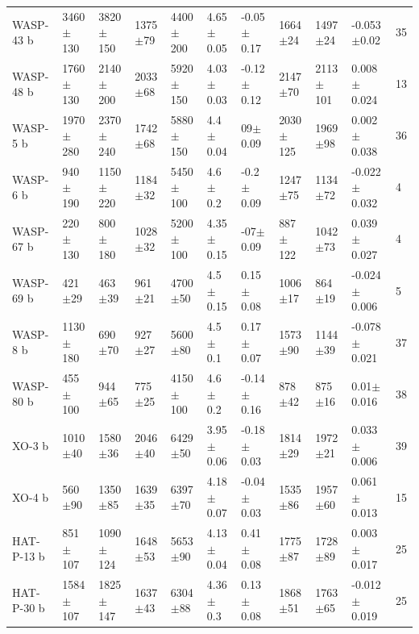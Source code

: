 \begin{subappendices}
{\begin{landscape}
\begin{longtable}{lllllllllll}
WASP-43 b   &    3460$\pm$130 &    3820$\pm$150 &   1375$\pm$79 &   4400$\pm$200 &  4.65$\pm$0.05 &  -0.05$\pm$0.17 &        1664$\pm$24 &        1497$\pm$24 &   -0.053$\pm$0.02 &         35 \\
WASP-48 b   &    1760$\pm$130 &    2140$\pm$200 &   2033$\pm$68 &   5920$\pm$150 &  4.03$\pm$0.03 &  -0.12$\pm$0.12 &        2147$\pm$70 &       2113$\pm$101 &   0.008$\pm$0.024 &       13 \\
WASP-5 b    &    1970$\pm$280 &    2370$\pm$240 &   1742$\pm$68 &   5880$\pm$150 &   4.4$\pm$0.04 &   09$\pm$0.09 &       2030$\pm$125 &        1969$\pm$98 &   0.002$\pm$0.038 &         36 \\
WASP-6 b    &     940$\pm$190 &    1150$\pm$220 &   1184$\pm$32 &   5450$\pm$100 &    4.6$\pm$0.2 &   -0.2$\pm$0.09 &        1247$\pm$75 &        1134$\pm$72 &  -0.022$\pm$0.032 &         4 \\
WASP-67 b   &     220$\pm$130 &     800$\pm$180 &   1028$\pm$32 &   5200$\pm$100 &  4.35$\pm$0.15 &  -07$\pm$0.09 &        887$\pm$122 &        1042$\pm$73 &   0.039$\pm$0.027 &         4 \\
WASP-69 b   &      421$\pm$29 &      463$\pm$39 &    961$\pm$21 &    4700$\pm$50 &   4.5$\pm$0.15 &   0.15$\pm$0.08 &        1006$\pm$17 &         864$\pm$19 &  -0.024$\pm$0.006 &  5 \\
WASP-8 b    &    1130$\pm$180 &      690$\pm$70 &    927$\pm$27 &    5600$\pm$80 &    4.5$\pm$0.1 &   0.17$\pm$0.07 &        1573$\pm$90 &        1144$\pm$39 &  -0.078$\pm$0.021 &       37 \\
WASP-80 b   &     455$\pm$100 &      944$\pm$65 &    775$\pm$25 &   4150$\pm$100 &    4.6$\pm$0.2 &  -0.14$\pm$0.16 &         878$\pm$42 &         875$\pm$16 &    0.01$\pm$0.016 &         38 \\
XO-3 b      &     1010$\pm$40 &     1580$\pm$36 &   2046$\pm$40 &    6429$\pm$50 &  3.95$\pm$0.06 &  -0.18$\pm$0.03 &        1814$\pm$29 &        1972$\pm$21 &   0.033$\pm$0.006 &       39 \\
XO-4 b      &      560$\pm$90 &     1350$\pm$85 &   1639$\pm$35 &    6397$\pm$70 &  4.18$\pm$0.07 &  -0.04$\pm$0.03 &        1535$\pm$86 &        1957$\pm$60 &   0.061$\pm$0.013 &        15 \\
HAT-P-13 b  &     851$\pm$107 &    1090$\pm$124 &   1648$\pm$53 &    5653$\pm$90 &  4.13$\pm$0.04 &   0.41$\pm$0.08 &        1775$\pm$87 &        1728$\pm$89 &   0.003$\pm$0.017 &                25 \\
HAT-P-30 b  &    1584$\pm$107 &    1825$\pm$147 &   1637$\pm$43 &    6304$\pm$88 &   4.36$\pm$0.3 &   0.13$\pm$0.08 &        1868$\pm$51 &        1763$\pm$65 &  -0.012$\pm$0.019 &                25 \\

\end{longtable}
\end{landscape}}
\end{subappendices}
